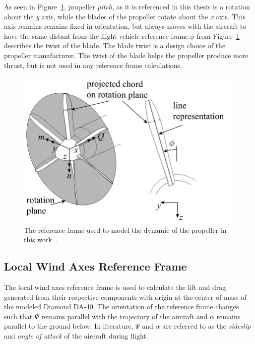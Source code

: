 \documentclass[12pt]{report}
\begin{document}
As seen in Figure~\ref{fig:propframe}, propeller \textit{pitch}, as it is referenced in this thesis is a rotation about the \textit{y} axis, while the blades of the propeller rotate about the \textit{x} axis. This axis remains remains fixed in orientation, but always moves with the aircraft to have the same distant from the flight vehicle reference frame.\( \phi{}\) from Figure~\ref{fig:propframe} describes the twist of the blade. The blade twist is a design choice of the propeller manufacturer. The twist of the blade helps the propeller produce more thrust, but is not used in any reference frame calculations.

\begin{figure}[!ht]\label{fig:propframe}
  \centering
  \includegraphics[width=0.75\linewidth]{Figures/propframe.png}
  \caption{The reference frame used to model the dynamic of the propeller in this work~\cite{vanarnhemEngineeringMethodEstimate2020}.}
\end{figure}

\subsection{Local Wind Axes Reference Frame}
The local wind axes reference frame is used to calculate the lift and drag generated from their respective components with origin at the center of mass of the modeled Diamond DA-40. The orientation of the reference frame changes such that \(\Psi \) remains parallel with the trajectory of the aircraft and \(\alpha \) remains parallel to the ground below. In literature, \( \Psi \) and \(\alpha \) are referred to as the \textit{sideslip} and \textit{angle of attack} of the aircraft during flight.
\end{document}
